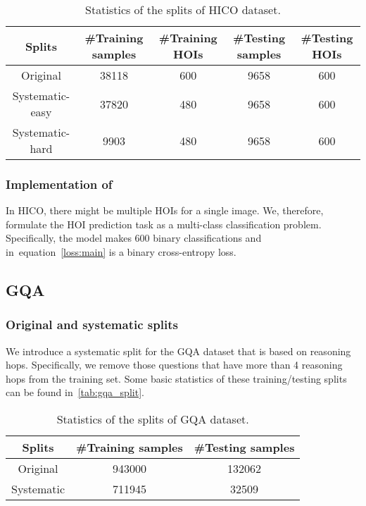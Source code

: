 \documentclass{article} \usepackage{iclr2022_conference,times}
\def\eqref#1{equation~\ref{#1}}
\begin{document}
\begin{table}[h]
    \centering
    \begin{tabular}{ccccc}
    \toprule
    Splits & \#Training samples & \#Training HOIs & \#Testing samples & \#Testing HOIs   \\
    \midrule
    Original & 38118 &600 & 9658 &600 \\
    Systematic-easy &37820& 480 &9658 &600 \\
    Systematic-hard &9903& 480&9658 &600 \\
    \bottomrule
    \end{tabular}
    \caption{Statistics of the splits of HICO dataset.}
    \label{tab:hico_split}
\end{table}

\subsubsection{Implementation of }

In HICO, there might be multiple HOIs for a single image. We, therefore, formulate the HOI prediction task as a multi-class classification problem. Specifically, the model makes 600 binary classifications and  in~\eqref{loss:main} is a binary cross-entropy loss.

\subsection{GQA}

\subsubsection{Original and systematic splits}

We introduce a systematic split for the GQA dataset that is based on reasoning hops. Specifically, we remove those questions that have more than 4 reasoning hops from the training set. Some basic statistics of these training/testing splits can be found in~\autoref{tab:gqa_split}.

\begin{table}[h]
    \centering
    \begin{tabular}{ccc}
    \toprule
    Splits & \#Training samples & \#Testing samples  \\
    \midrule
    Original &943000 &132062 \\
    Systematic &711945 &32509 \\
    \bottomrule
    \end{tabular}
    \caption{Statistics of the splits of GQA dataset.}
    \label{tab:gqa_split}
\end{table}
\end{document}
